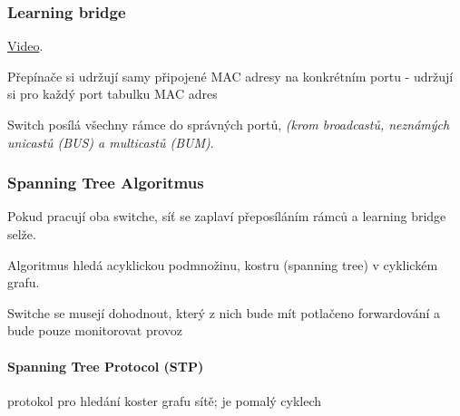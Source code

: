 \documentclass[10pt,a4paper]{article}
\begin{document}
\subsubsection{Learning bridge}

\href{https://youtu.be/x0ult-Ln9hc}{Video}.

Přepínače si udržují samy připojené MAC adresy na konkrétním portu - udržují si pro každý port tabulku MAC adres

Switch posílá všechny rámce do správných portů, \textit{(krom broadcastů, neznámých unicastů (BUS) a multicastů (BUM)}.

\subsubsection{Spanning Tree Algoritmus}

Pokud pracují oba switche, síť se zaplaví přeposíláním rámců a learning bridge selže.

Algoritmus hledá acyklickou podmnožinu, kostru (spanning tree) v cyklickém grafu.

Switche se musejí dohodnout, který z nich bude mít potlačeno forwardování a bude pouze monitorovat provoz

\paragraph*{Spanning Tree Protocol (STP)} protokol pro hledání koster grafu sítě; je pomalý
cyklech
\end{document}
